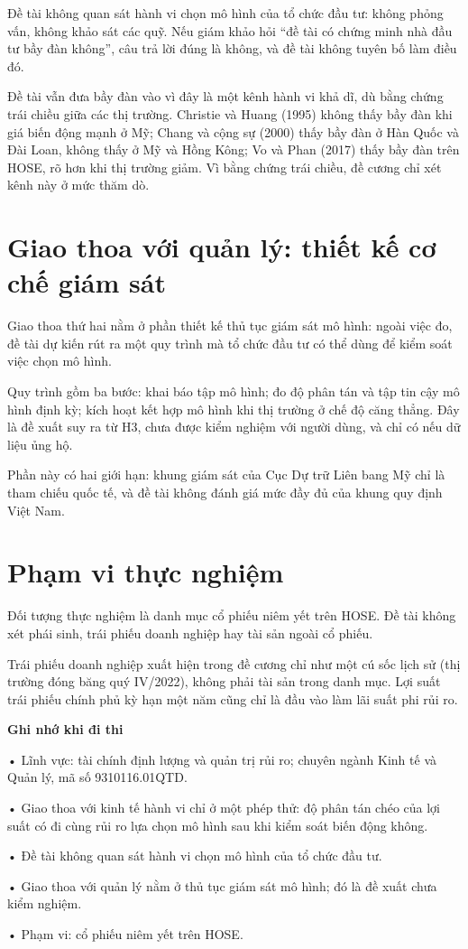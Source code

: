 Đề tài không quan sát hành vi chọn mô hình của tổ chức đầu tư: không phỏng vấn, không khảo sát các quỹ. Nếu giám khảo hỏi “đề tài có chứng minh nhà đầu tư bầy đàn không”, câu trả lời đúng là không, và đề tài không tuyên bố làm điều đó.

Đề tài vẫn đưa bầy đàn vào vì đây là một kênh hành vi khả dĩ, dù bằng chứng trái chiều giữa các thị trường. Christie và Huang (1995) không thấy bầy đàn khi giá biến động mạnh ở Mỹ; Chang và cộng sự (2000) thấy bầy đàn ở Hàn Quốc và Đài Loan, không thấy ở Mỹ và Hồng Kông; Vo và Phan (2017) thấy bầy đàn trên HOSE, rõ hơn khi thị trường giảm. Vì bằng chứng trái chiều, đề cương chỉ xét kênh này ở mức thăm dò.

\section{Giao thoa với quản lý: thiết kế cơ chế giám sát}

Giao thoa thứ hai nằm ở phần thiết kế thủ tục giám sát mô hình: ngoài việc đo, đề tài dự kiến rút ra một quy trình mà tổ chức đầu tư có thể dùng để kiểm soát việc chọn mô hình.

Quy trình gồm ba bước: khai báo tập mô hình; đo độ phân tán và tập tin cậy mô hình định kỳ; kích hoạt kết hợp mô hình khi thị trường ở chế độ căng thẳng. Đây là đề xuất suy ra từ H3, chưa được kiểm nghiệm với người dùng, và chỉ có nếu dữ liệu ủng hộ.

Phần này có hai giới hạn: khung giám sát của Cục Dự trữ Liên bang Mỹ chỉ là tham chiếu quốc tế, và đề tài không đánh giá mức đầy đủ của khung quy định Việt Nam.

\section{Phạm vi thực nghiệm}

Đối tượng thực nghiệm là danh mục cổ phiếu niêm yết trên HOSE. Đề tài không xét phái sinh, trái phiếu doanh nghiệp hay tài sản ngoài cổ phiếu.

Trái phiếu doanh nghiệp xuất hiện trong đề cương chỉ như một cú sốc lịch sử (thị trường đóng băng quý IV/2022), không phải tài sản trong danh mục. Lợi suất trái phiếu chính phủ kỳ hạn một năm cũng chỉ là đầu vào làm lãi suất phi rủi ro.

\begin{tcolorbox}[breakable]
\textbf{Ghi nhớ khi đi thi}

• Lĩnh vực: tài chính định lượng và quản trị rủi ro; chuyên ngành Kinh tế và Quản lý, mã số 9310116.01QTD.

• Giao thoa với kinh tế hành vi chỉ ở một phép thử: độ phân tán chéo của lợi suất có đi cùng rủi ro lựa chọn mô hình sau khi kiểm soát biến động không.

• Đề tài không quan sát hành vi chọn mô hình của tổ chức đầu tư.

• Giao thoa với quản lý nằm ở thủ tục giám sát mô hình; đó là đề xuất chưa kiểm nghiệm.

• Phạm vi: cổ phiếu niêm yết trên HOSE.
\end{tcolorbox}

